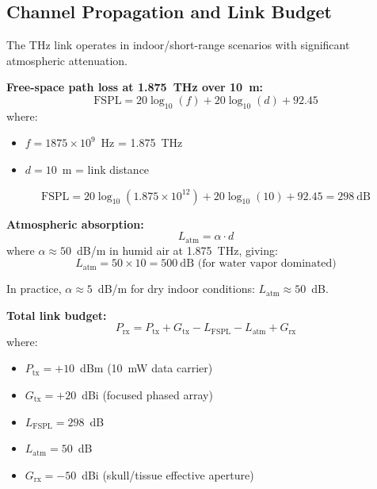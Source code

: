 \begin{center}
\end{center}

\subsection{Channel Propagation and Link Budget}

The THz link operates in indoor/short-range scenarios with significant atmospheric attenuation.

\textbf{Free-space path loss at 1.875~THz over 10~m:}
\begin{equation}
\text{FSPL} = 20\log_{10}(f) + 20\log_{10}(d) + 92.45
\end{equation}
where:
\begin{itemize}
\item $f = 1875 \times 10^9$~Hz = 1.875~THz
\item $d = 10$~m = link distance
\end{itemize}

\begin{equation}
\text{FSPL} = 20\log_{10}(1.875 \times 10^{12}) + 20\log_{10}(10) + 92.45 = 298~\text{dB}
\end{equation}

\textbf{Atmospheric absorption:}
\begin{equation}
L_{\text{atm}} = \alpha \cdot d
\end{equation}
where $\alpha \approx 50$~dB/m in humid air at 1.875~THz, giving:
\begin{equation}
L_{\text{atm}} = 50 \times 10 = 500~\text{dB (for water vapor dominated)}
\end{equation}

In practice, $\alpha \approx 5$~dB/m for dry indoor conditions: $L_{\text{atm}} \approx 50$~dB.

\textbf{Total link budget:}
\begin{equation}
P_{\text{rx}} = P_{\text{tx}} + G_{\text{tx}} - L_{\text{FSPL}} - L_{\text{atm}} + G_{\text{rx}}
\end{equation}
where:
\begin{itemize}
\item $P_{\text{tx}} = +10$~dBm (10~mW data carrier)
\item $G_{\text{tx}} = +20$~dBi (focused phased array)
\item $L_{\text{FSPL}} = 298$~dB
\item $L_{\text{atm}} = 50$~dB
\item $G_{\text{rx}} = -50$~dBi (skull/tissue effective aperture)
\end{itemize}

